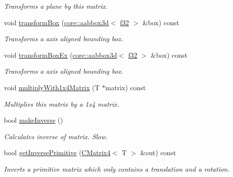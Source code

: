 \begin{DoxyCompactItemize}
\begin{DoxyCompactList}\small\item\em Transforms a plane by this matrix. \end{DoxyCompactList}\item 
void \hyperlink{classirr_1_1core_1_1CMatrix4_a4d44428ac5dde99e21f0eb4c50195692}{transform\+Box} (\hyperlink{classirr_1_1core_1_1aabbox3d}{core\+::aabbox3d}$<$ \hyperlink{namespaceirr_a0277be98d67dc26ff93b1a6a1d086b07}{f32} $>$ \&box) const
\begin{DoxyCompactList}\small\item\em Transforms a axis aligned bounding box. \end{DoxyCompactList}\item 
void \hyperlink{classirr_1_1core_1_1CMatrix4_a2fcdfa14ef16240470e2b46d19a5cb43}{transform\+Box\+Ex} (\hyperlink{classirr_1_1core_1_1aabbox3d}{core\+::aabbox3d}$<$ \hyperlink{namespaceirr_a0277be98d67dc26ff93b1a6a1d086b07}{f32} $>$ \&box) const
\begin{DoxyCompactList}\small\item\em Transforms a axis aligned bounding box. \end{DoxyCompactList}\item 
\mbox{\label{classirr_1_1core_1_1CMatrix4_a21e0a68953d63bd1fca70a671a9e93b8}} 
void \hyperlink{classirr_1_1core_1_1CMatrix4_a21e0a68953d63bd1fca70a671a9e93b8}{multiply\+With1x4\+Matrix} (T $\ast$matrix) const
\begin{DoxyCompactList}\small\item\em Multiplies this matrix by a 1x4 matrix. \end{DoxyCompactList}\item 
bool \hyperlink{classirr_1_1core_1_1CMatrix4_a3fbface2cb6b959af64f82a5bb17540e}{make\+Inverse} ()
\begin{DoxyCompactList}\small\item\em Calculates inverse of matrix. Slow. \end{DoxyCompactList}\item 
bool \hyperlink{classirr_1_1core_1_1CMatrix4_aaeab6a8672ecc3d9790c8e7f141db795}{get\+Inverse\+Primitive} (\hyperlink{classirr_1_1core_1_1CMatrix4}{C\+Matrix4}$<$ T $>$ \&out) const
\begin{DoxyCompactList}\small\item\em Inverts a primitive matrix which only contains a translation and a rotation. \end{DoxyCompactList}\item 

\end{DoxyCompactItemize}
